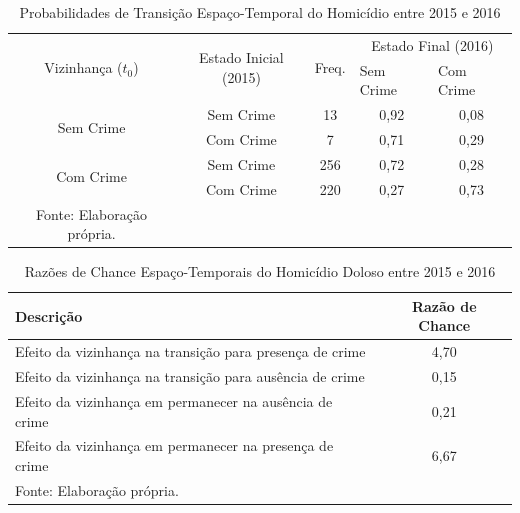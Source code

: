 \documentclass[12pt,openright,oneside,a4paper,english,french,spanish]{abntex2}
\numberwithin{table}{section} %
\numberwithin{figure}{section} %
\begin{document}
\begin{subappendices}
\begin{table}[H]
\centering
\caption{Probabilidades de Transição Espaço-Temporal do Homicídio entre 2015 e 2016}
        \begin{tabular}{ccccc}
            \hline
            \multirow{2}{*}{Vizinhança ($t_0$)} & \multirow{2}{*}{Estado Inicial (2015)} & \multirow{2}{*}{Freq.} & \multicolumn{2}{c}{Estado Final (2016)}  \\\cline{4-5} %
                                        & & & \multicolumn{1}{l}{Sem Crime} & \multicolumn{1}{l}{Com Crime} \\\hline
            \multirow{2}{*}{Sem Crime} & {Sem Crime} & 13 &  {0,92} & {0,08} \\
                                       & {Com Crime} & 7 &   {0,71} & {0,29} \\\hline
            \multirow{2}{*}{Com Crime} & {Sem Crime} & 256 & {0,72} & {0,28} \\
                                       & {Com Crime} & 220 & {0,27} & {0,73} \\\hline
            \tiny Fonte: Elaboração própria.
        \end{tabular}
    \label{tab:prob_espaco_tempo_hom_dol_2015_2016}
\end{table}


\begin{table}[H]
\centering
\caption{Razões de Chance Espaço-Temporais do Homicídio Doloso entre 2015 e 2016}
        \begin{tabular}{lc}
            \hline
            {\textbf{Descrição}} & {\textbf{Razão de Chance}} \\\hline
            {Efeito da vizinhança na transição para presença de crime} & {4,70} \\
            {Efeito da vizinhança na transição para ausência de crime} & {0,15} \\
            {Efeito da vizinhança em permanecer na ausência de crime} & {0,21} \\
            {Efeito da vizinhança em permanecer na presença de crime} & {6,67} \\\hline
            \tiny Fonte: Elaboração própria.
        \end{tabular}
    \label{tab:odds_espaco_tempo_hom_dol_2015_2016}
\end{table}




















\end{subappendices}
\end{document}
